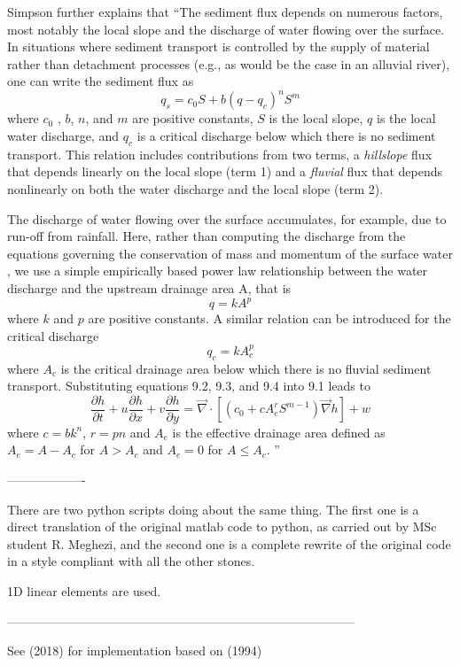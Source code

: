 Simpson further explains that ``The sediment flux
depends on numerous factors, most notably the local slope and the discharge of water flowing over
the surface. In situations where sediment transport is controlled by the supply of material rather
than detachment processes (e.g., as would be the case in an alluvial river), one can write the sediment
flux as
\[
q_s = c_0 S + b(q-q_c)^n S^m
\]
where $c_0$ , $b$, $n$, and $m$ are positive constants, $S$ is the local slope, 
$q$ is the local water discharge, and $q_c$ is
a critical discharge below which there is no sediment transport. This relation includes contributions
from two terms, a {\it hillslope} flux that depends linearly on the local slope (term 1) 
and a {\it fluvial} flux that depends nonlinearly on both the water discharge and the local slope (term 2).

The discharge of water flowing over the surface accumulates, for example, due to run-off from rainfall. Here,
rather than computing the discharge from the equations governing the conservation of mass and
momentum of the surface water \textcite{sica06}, we use a simple empirically 
based power law relationship between the water discharge and the upstream drainage area A,
that is
\[
q=kA^p
\]
where $k$ and $p$ are positive constants. A similar relation can be introduced for the critical discharge
\[
q_c=kA_c^p
\]
where $A_c$ is the critical drainage area below which there is no fluvial sediment transport. Substituting
equations 9.2, 9.3, and 9.4 into 9.1 leads to
\[
\frac{\partial h}{\partial t} + u \frac{\partial h}{\partial x}+ v \frac{\partial h}{\partial y}
= \vec\nabla \cdot \left[
(c_0 + c A_e^r S^{m-1}) \vec\nabla h
\right] + w
\]
where $c=bk^n$, $r=pn$ and $A_e$ is the effective drainage area defined as $A_e = A-A_c$ 
for $A>A_c$ and $A_e = 0$ for $A \le A_c$.
''

-------------------

There are two python scripts doing about the same thing. The first one is a direct translation 
of the original matlab code to python, as carried out by MSc student R. Meghezi, and the second
one is a complete rewrite of the original code in a style compliant with all the other stones.

1D linear elements are used.

------------------------------------------------------------------------------------

See \textcite{yaca18} (2018) for implementation based on \textcite{kobe94} (1994)



